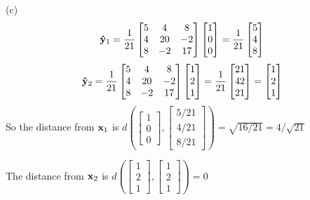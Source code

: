 \documentclass[a4paper, 12pt]{article}
\begin{document}
\begin{solution}
        (c)
        \[
        \mathbf{\hat{y}}_1 = \frac{1}{21}\begin{bmatrix}
            5 & 4 & 8 \\
            4 & 20 & -2 \\
            8 & -2 & 17
            \end{bmatrix}\begin{bmatrix}
            1 \\
            0 \\
            0
            \end{bmatrix} =
            \frac{1}{21}
            \begin{bmatrix}
                5\\4\\8
            \end{bmatrix}
        \]
        \[
        \mathbf{\hat{y}}_2 = \frac{1}{21}\begin{bmatrix}
            5 & 4 & 8 \\
            4 & 20 & -2 \\
            8 & -2 & 17
            \end{bmatrix}\begin{bmatrix}
            1 \\2\\1
            \end{bmatrix} = \frac{1}{21}\begin{bmatrix}
            21 \\
            42 \\
            21
            \end{bmatrix} = \begin{bmatrix}
            1\\
            2\\
            1
            \end{bmatrix}
        \]
        So the distance from $\mathbf{x}_1$ is $d(\begin{bmatrix}
            1 \\ 0 \\ 0
        \end{bmatrix}, \begin{bmatrix}
            5/21 \\ 4/21 \\ 8/21
        \end{bmatrix}) = \sqrt{16/21} = 4/\sqrt{21}$
        
        The distance from $\mathbf{x}_2$ is $d(\begin{bmatrix}
        1 \\ 2 \\ 1
        \end{bmatrix}, \begin{bmatrix}
        1 \\ 2 \\ 1
        \end{bmatrix}) = 0$
\end{solution}
\end{document}
